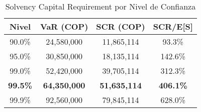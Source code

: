 \begin{table}[H]
\centering
\caption{Solvency Capital Requirement por Nivel de Confianza}
\begin{tabular}{cccc}
\hline
\textbf{Nivel} & \textbf{VaR (COP)} & \textbf{SCR (COP)} & \textbf{SCR/E[S]} \\
\hline
90.0\% & 24,580,000 & 11,865,114 & 93.3\% \\
95.0\% & 30,850,000 & 18,135,114 & 142.6\% \\
99.0\% & 52,420,000 & 39,705,114 & 312.3\% \\
\textbf{99.5\%} & \textbf{64,350,000} & \textbf{51,635,114} & \textbf{406.1\%} \\
99.9\% & 92,560,000 & 79,845,114 & 628.0\% \\
\hline
\end{tabular}
\end{table}